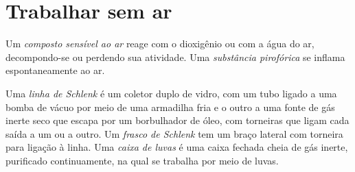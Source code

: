 \section{Trabalhar sem ar}

\begin{definition}\label{def:b3:lab-techniques-3:air-sensitive}
Um \emph{composto sensível ao ar} reage com o
dioxigênio ou com a água do ar, decompondo-se ou perdendo sua atividade. Uma
\emph{substância pirofórica} se inflama espontaneamente
ao ar.
\end{definition}

\begin{definition}\label{def:b3:lab-techniques-3:schlenk}
Uma \emph{linha de Schlenk} é um coletor duplo de vidro, com um tubo
ligado a uma bomba de vácuo por meio de uma armadilha fria e o outro a uma fonte de gás inerte
seco que escapa por um borbulhador de óleo, com torneiras que ligam cada saída a
um ou a outro. Um \emph{frasco de Schlenk} tem um braço lateral com torneira
para ligação à linha. Uma \emph{caixa de luvas} é uma caixa fechada
cheia de gás inerte, purificado continuamente, na qual se trabalha por meio de
luvas.
\end{definition}

